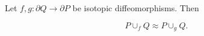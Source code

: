 Let $f, g: \partial Q \to \partial P$ be isotopic diffeomorphisms. Then

$$P \cup_f Q \approx P \cup_g Q.$$
